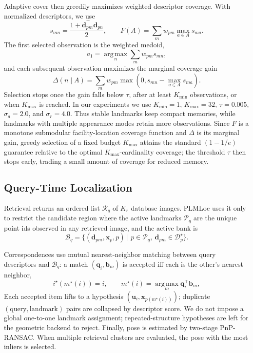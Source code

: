 \documentclass[letterpaper,10 pt,conference]{ieeeconf}
\newcommand{\method}{PLMLoc}
\begin{document}
Adaptive cover then greedily maximizes weighted descriptor coverage. With normalized descriptors, we use
\[
s_{mn}=\frac{1+\mathbf{d}_{pm}^{\top}\mathbf{d}_{pn}}{2},
\qquad
F(A)=\sum_m w_{pm}\max_{a\in A}s_{ma}.
\]
The first selected observation is the weighted medoid,
\[
a_1=\operatorname*{arg\,max}_n \sum_m w_{pm}s_{mn},
\]
and each subsequent observation maximizes the marginal coverage gain
\[
\Delta(n\mid A)=
\sum_m w_{pm}\max\!\left(0,s_{mn}-\max_{a\in A}s_{ma}\right).
\]
Selection stops once the gain falls below $\tau$, after at least $K_{\min}$ observations, or when $K_{\max}$ is reached. In our experiments we use $K_{\min}=1$, $K_{\max}=32$, $\tau=0.005$, $\sigma_a=2.0$, and $\sigma_r=4.0$. Thus stable landmarks keep compact memories, while landmarks with multiple appearance modes retain more observations. Since $F$ is a monotone submodular facility-location coverage function and $\Delta$ is its marginal gain, greedy selection of a fixed budget $K_{\max}$ attains the standard $(1-1/e)$ guarantee relative to the optimal $K_{\max}$-cardinality coverage; the threshold $\tau$ then stops early, trading a small amount of coverage for reduced memory.

\subsection{Query-Time Localization}
Retrieval returns an ordered list $\mathcal{R}_q$ of $K_r$ database images. \method{} uses it only to restrict the candidate region where the active landmarks $\mathcal{P}_q$ are the unique point ids observed in any retrieved image, and the active bank is
\begin{equation}
    \mathcal{B}_q=\{(\mathbf{d}_{pm},\mathbf{x}_p,p)\mid p\in\mathcal{P}_q,\ \mathbf{d}_{pm}\in\mathcal{D}^{\star}_p\}.
\end{equation}

Correspondences use mutual nearest-neighbor matching between query descriptors and $\mathcal{B}_q$: a match $(\mathbf{q}_i,\mathbf{b}_m)$ is accepted iff each is the other's nearest neighbor,
\begin{equation}
    i^{\star}(m^{\star}(i))=i,
    \qquad
    m^{\star}(i)=\operatorname*{arg\,max}_{m}\mathbf{q}_i^{\top}\mathbf{b}_m,
    \label{eq:mnn}
\end{equation}
Each accepted item lifts to a hypothesis $(\mathbf{u}_i,\mathbf{x}_{p(m^{\star}(i))})$; duplicate $(\text{query},\text{landmark})$ pairs are collapsed by descriptor score. We do not impose a global one-to-one landmark assignment; repeated-structure hypotheses are left for the geometric backend to reject. Finally, pose is estimated by two-stage PnP-RANSAC. When multiple retrieval clusters are evaluated, the pose with the most inliers is selected.
\end{document}
